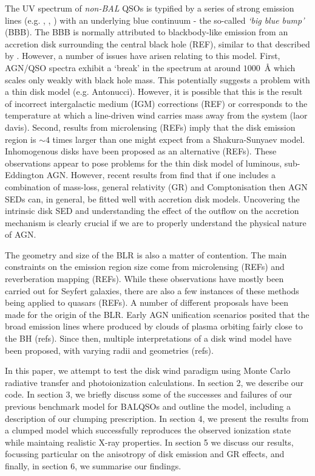 \documentclass[useAMS,usenatbib]{mn2e_x}
\begin{document}
The UV spectrum of {\em non-BAL} QSOs is typified by a series
of strong emission lines (e.g. \la, \civ, \nv) with an underlying blue continuum
- the so-called {\sl `big blue bump'} (BBB). The BBB is normally attributed to blackbody-like
emission from an accretion disk surrounding the central black hole (REF), similar
to that described by \cite{shakurasunyaev1973}. However,
a number of issues have arisen relating to this model. First, 
AGN/QSO spectra exhibit a `break' in the spectrum at around $1000$~\AA 
which scales only weakly with black hole mass. This potentially 
suggests a problem with a thin disk model (e.g. Antonucci). 
However, it is possible that this is the result of incorrect intergalactic medium
(IGM) corrections (REF) or corresponds to the temperature 
at which a line-driven wind carries mass away from the system (laor davis).
Second, results from microlensing (REFs) imply that the disk emission 
region is $\sim4$ times larger than one might expect from a Shakura-Sunyaev
model. Inhomogenous disks have been proposed as an alternative (REFs).
These observations appear to pose problems for the thin disk model of luminous,
sub-Eddington AGN. However, recent results from \cite{capellupo2015} find 
that if one includes a combination of mass-loss, general relativity (GR) and Comptonisation
then AGN SEDs can, in general, be fitted well with accretion disk models.
Uncovering the intrinsic disk SED and understanding the effect of the outflow on the accretion 
mechanism is clearly crucial if we are to properly understand the physical nature
of AGN.

The geometry and size of the BLR is also a matter of contention. 
The main constraints on the emission region size come from microlensing (REFs)
and reverberation mapping (REFs). While these observations have mostly been
carried out for Seyfert galaxies, there are also a few instances of these methods
being applied to quasars (REFs). A number of different proposals have been made 
for the origin of the BLR. Early AGN unification scenarios posited that the broad emission lines
where produced by clouds of plasma orbiting fairly close to the BH (refs).
Since then, multiple interpretations of a disk wind model have been proposed,
with varying radii and geometries (refs). 

In this paper, we attempt to test the disk wind paradigm 
using Monte Carlo radiative transfer and photoionization calculations.
In section 2, we describe our code. In section 3, we briefly discuss some 
of the successes and failures of our previous benchmark model for BALQSOs 
\citep[][hereafter H13]{higginbottom2013} and outline the model, including 
a description of our clumping prescription. In section 4, we present the results 
from a clumped model which successfully reproduces
the observed ionization state while maintaing realistic X-ray properties.
In section 5 we discuss our results, focussing particular on the anisotropy of 
disk emission and GR effects, and finally, in section 6, we summarise our findings.
\end{document}
